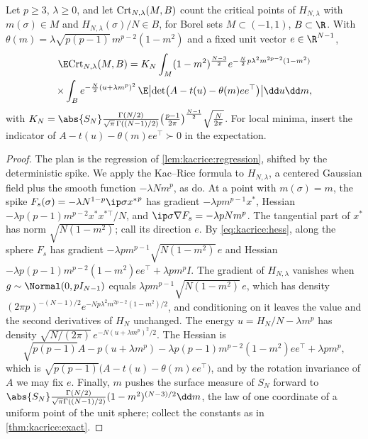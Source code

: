 \begin{refsection}
\begin{proposition}\label{prop:kacrice:spiked}
Let $p\ge3$, $\lambda\ge0$, and let $\mathrm{Crt}_{N,\lambda}(M,B)$ count the critical points of $H_{N,\lambda}$ with $m(\sigma)\in M$ and $H_{N,\lambda}(\sigma)/N\in B$, for Borel sets $M\subset(-1,1)$, $B\subset\R$. With $\theta(m)=\lambda\sqrt{p(p-1)}\,m^{p-2}(1-m^2)$ and a fixed unit vector $e\in\R^{N-1}$,
\begin{multline*}
\E\kacriceCrt_{N,\lambda}(M,B)=K_N\int_M(1-m^2)^{\frac{N-3}2}e^{-\frac N2p\lambda^2m^{2p-2}(1-m^2)}\\
\times\int_Be^{-\frac N2(u+\lambda m^p)^2}\,\E\bigl\lvert\det\bigl(A-t(u)-\theta(m)ee^\top\bigr)\bigr\rvert\dd u\dd m,
\end{multline*}
with $K_N=\abs{S_N}\frac{\Gamma(N/2)}{\sqrt\pi\,\Gamma((N-1)/2)}\bigl(\frac{p-1}{2\pi}\bigr)^{\frac{N-1}2}\sqrt{\frac N{2\pi}}$. For local minima, insert the indicator of $A-t(u)-\theta(m)ee^\top\succ0$ in the expectation.
\end{proposition}

\begin{proof}
The plan is the regression of \cref{lem:kacrice:regression}, shifted by the deterministic spike. We apply the Kac--Rice formula to $H_{N,\lambda}$, a centered Gaussian field plus the smooth function $-\lambda Nm^p$, as \textcite[Lemmas~1--3]{BenArousMeiMontanariNica2019} do. At a point with $m(\sigma)=m$, the spike $F_s(\sigma)=-\lambda N^{1-p}\ip\sigma{x^*}^p$ has gradient $-\lambda pm^{p-1}x^*$, Hessian $-\lambda p(p-1)m^{p-2}x^*x^{*\top}/N$, and $\ip\sigma{\nabla F_s}=-\lambda pNm^p$. The tangential part of $x^*$ has norm $\sqrt{N(1-m^2)}$; call its direction $e$. By \eqref{eq:kacrice:hess}, along the sphere $F_s$ has gradient $-\lambda pm^{p-1}\sqrt{N(1-m^2)}\,e$ and Hessian $-\lambda p(p-1)m^{p-2}(1-m^2)ee^\top+\lambda pm^pI$. The gradient of $H_{N,\lambda}$ vanishes when $g\sim\Normal(0,pI_{N-1})$ equals $\lambda pm^{p-1}\sqrt{N(1-m^2)}\,e$, which has density $(2\pi p)^{-(N-1)/2}e^{-Np\lambda^2m^{2p-2}(1-m^2)/2}$, and conditioning on it leaves the value and the second derivatives of $H_N$ unchanged. The energy $u=H_N/N-\lambda m^p$ has density $\sqrt{N/(2\pi)}\,e^{-N(u+\lambda m^p)^2/2}$. The Hessian is
\[
\sqrt{p(p-1)}A-p(u+\lambda m^p)-\lambda p(p-1)m^{p-2}(1-m^2)ee^\top+\lambda pm^p,
\]
which is $\sqrt{p(p-1)}\bigl(A-t(u)-\theta(m)ee^\top\bigr)$, and by the rotation invariance of $A$ we may fix $e$. Finally, $m$ pushes the surface measure of $S_N$ forward to $\abs{S_N}\frac{\Gamma(N/2)}{\sqrt\pi\Gamma((N-1)/2)}(1-m^2)^{(N-3)/2}\dd m$, the law of one coordinate of a uniform point of the unit sphere; collect the constants as in \cref{thm:kacrice:exact}.
\end{proof}


\end{refsection}
